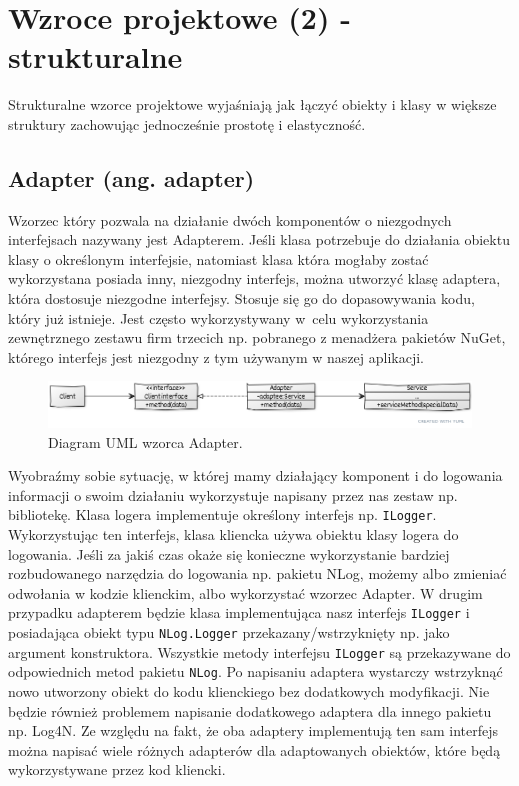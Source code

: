 \section{Wzroce projektowe (2) - strukturalne}

Strukturalne wzorce projektowe wyjaśniają jak łączyć obiekty i klasy w większe struktury zachowując jednocześnie prostotę i elastyczność.

\subsection{Adapter (ang. adapter)}\label{sec/lab3/adapter}

Wzorzec który pozwala na działanie dwóch komponentów o niezgodnych interfejsach nazywany jest Adapterem. Jeśli klasa potrzebuje do działania obiektu klasy o określonym interfejsie, natomiast klasa która mogłaby zostać wykorzystana posiada inny, niezgodny interfejs, można utworzyć klasę adaptera, która dostosuje niezgodne interfejsy. Stosuje się go do dopasowywania kodu, który już istnieje. Jest często wykorzystywany w~celu wykorzystania zewnętrznego zestawu firm trzecich np. pobranego z menadżera pakietów NuGet, którego interfejs jest niezgodny z tym używanym w naszej aplikacji.

\begin{figure}[hbt!]
	\centering
	\includegraphics[width=0.9\linewidth]{images/AdapterUml}
	\caption{Diagram UML wzorca Adapter.}
	\label{lab3/fig/AdapterUml}
\end{figure}
%

Wyobraźmy sobie sytuację, w której mamy działający komponent i do logowania informacji o swoim działaniu wykorzystuje napisany przez nas zestaw np. bibliotekę. Klasa logera implementuje określony interfejs np. \texttt{ILogger}. Wykorzystując ten interfejs, klasa kliencka używa obiektu klasy logera do logowania. Jeśli za jakiś czas okaże się konieczne wykorzystanie bardziej rozbudowanego narzędzia do logowania np. pakietu NLog, możemy albo zmieniać odwołania w kodzie klienckim, albo wykorzystać wzorzec Adapter. W drugim przypadku adapterem będzie klasa implementująca nasz interfejs \texttt{ILogger} i posiadająca obiekt typu \texttt{NLog.Logger} przekazany/wstrzyknięty np. jako argument konstruktora. Wszystkie metody interfejsu \texttt{ILogger} są przekazywane do odpowiednich metod pakietu \texttt{NLog}. Po napisaniu adaptera wystarczy wstrzyknąć nowo utworzony obiekt do kodu klienckiego bez dodatkowych modyfikacji. Nie będzie również problemem napisanie dodatkowego adaptera dla innego pakietu np. Log4N. Ze względu na fakt, że oba adaptery implementują ten sam interfejs można napisać wiele różnych adapterów dla adaptowanych obiektów, które będą wykorzystywane przez kod kliencki.

